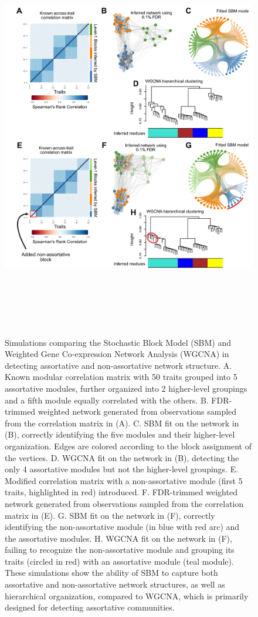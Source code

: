 \documentclass[
]{article}
\begin{document}
\begin{figure}
\centering
\includegraphics[width=\textwidth,height=7in]{figures/simulation_figure.png}
\caption{Simulations comparing the Stochastic Block Model (SBM) and
Weighted Gene Co-expression Network Analysis (WGCNA) in detecting
assortative and non-assortative network structure. A. Known modular
correlation matrix with 50 traits grouped into 5 assortative modules,
further organized into 2 higher-level groupings and a fifth module
equally correlated with the others. B. FDR-trimmed weighted network
generated from observations sampled from the correlation matrix in (A).
C. SBM fit on the network in (B), correctly identifying the five modules
and their higher-level organization. Edges are colored according to the
block assignment of the vertices. D. WGCNA fit on the network in (B),
detecting the only 4 assortative modules but not the higher-level
groupings. E. Modified correlation matrix with a non-assortative module
(first 5 traits, highlighted in red) introduced. F. FDR-trimmed weighted
network generated from observations sampled from the correlation matrix
in (E). G. SBM fit on the network in (F), correctly identifying the
non-assortative module (in blue with red arc) and the assortative
modules. H. WGCNA fit on the network in (F), failing to recognize the
non-assortative module and grouping its traits (circled in red) with an
assortative module (teal module). These simulations show the ability of
SBM to capture both assortative and non-assortative network structures,
as well as hierarchical organization, compared to WGCNA, which is
primarily designed for detecting assortative
communities.}\label{fig:simulations}
\end{figure}
\end{document}

